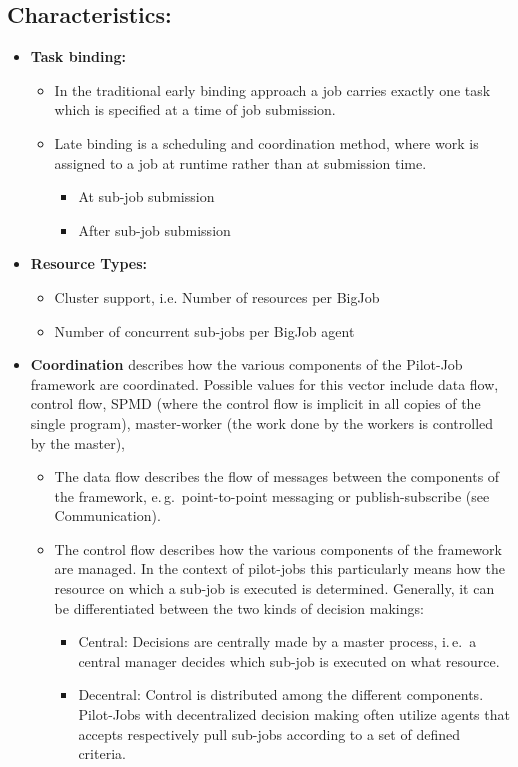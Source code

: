 \documentclass[]{article}
\begin{document}
\subsection{Characteristics:}
\begin{itemize}
	\item \textbf{Task binding:~\cite{diane-thesis}} 
		\begin{itemize}
			\item In the traditional early binding approach a job carries
			 exactly one task which is specified at a time of job submission.
			\item Late binding is a scheduling and coordination
			 method, where work is assigned to a job at runtime rather than at
			 submission time.
			\begin{itemize}
				\item At sub-job submission 
				\item After sub-job submission
			\end{itemize}
		\end{itemize} 	

	\item \textbf{Resource Types:}
	\begin{itemize}
		\item Cluster support, i.e. Number of resources per BigJob
		\item Number of concurrent sub-jobs per BigJob agent
	\end{itemize}
	\item \textbf{Coordination} describes how the various components of 
	the Pilot-Job framework are	coordinated. Possible values for this vector include data
	flow, control flow, SPMD (where the control flow is implicit in all copies of the single program), master-worker
	(the work done by the workers is controlled by the master),
	\begin{itemize}
		\item The data flow describes the flow of messages between the components of the framework, e.\,g.\ point-to-point messaging or publish-subscribe (see Communication).
		\item The control flow describes how the various components of the
		 framework are managed. In the context of pilot-jobs this particularly means how the resource on which a sub-job is executed is determined. Generally, it can be differentiated between the two kinds of decision makings:
			\begin{itemize}
				\item Central: Decisions are centrally made by a master
				 process, i.\,e.\ a central manager decides which sub-job is
				 executed on what resource.
				\item Decentral: Control is distributed among the 
				different components. Pilot-Jobs with decentralized decision 
				making often utilize agents that accepts respectively pull 
				sub-jobs according to a set of defined criteria.
			\end{itemize}
			

\end{itemize}
\end{itemize}
\end{document}
